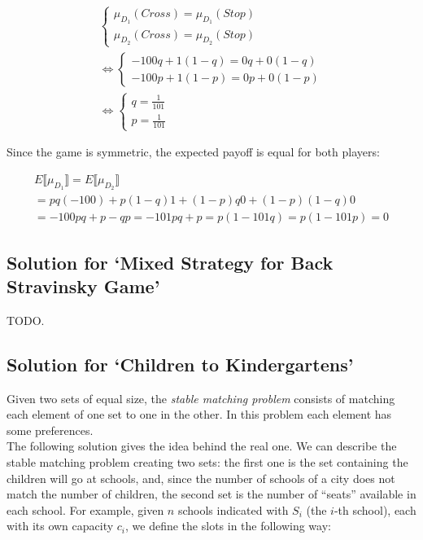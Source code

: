 \documentclass{article}
\begin{document}
\begin{align*}
    \begin{cases}
        \mu_{D_1}(\textit{Cross})  = \mu_{D_1}(\textit{Stop}) \\
        \mu_{D_2}(\textit{Cross})  = \mu_{D_2}(\textit{Stop})
    \end{cases} \\
    \iff
    \begin{cases}
        -100q + 1(1 - q) = 0 q + 0(1 - q) \\
        -100p + 1(1 - p) = 0 p + 0(1 - p)
    \end{cases} \\
    \iff
    \begin{cases}
        q = \frac{1}{101} \\
        p = \frac{1}{101}
    \end{cases}
\end{align*}

\noindent Since the game is symmetric, the expected payoff is equal for both players:

\begin{align*}
    E \llbracket \mu_{D_1} \rrbracket = E \llbracket \mu_{D_2} \rrbracket  \\
    = pq(-100) + p(1- q)1 + (1- p)q0 + (1 - p)(1 - q)0 \\
    = -100pq + p - qp = -101pq + p = p (1 - 101q) = p(1 - 101p) = 0
\end{align*}

\subsection{Solution for `Mixed Strategy for Back Stravinsky Game'}

TODO.

\subsection{Solution for `Children to Kindergartens'}

Given two sets of equal size, the \textit{stable matching problem} consists of matching each element of one set to one in the other. In this 
problem each element has some preferences.\\

\noindent The following solution gives the idea behind the real one. We can describe the stable matching problem creating two sets: the first one is the set containing the children will go at schools, and, since the number
of schools of a city does not match the number of children, the second set is the number of ``seats'' available in each school.
For example, given $n$ schools indicated with $S_i$ (the $i$-th school), each with its own capacity $c_i$,
we define the slots in the following way:
\end{document}
